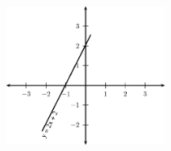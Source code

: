 {\begin{mdframed}[linewidth=4, leftmargin=40, rightmargin=40]
\begin{exercise}
\begin{enumerate}[noitemsep, label=\textbf{Step} \textbf{\arabic*}. ]
\setcounter{subfigure}{0}
\begin{figure}[H] %
\begin{center}
\label{m39338*id239959!!!underscore!!!media}\label{m39338*id239959!!!underscore!!!printimage}\includegraphics[width=200px]{col11306.imgs/m39338_MG10C11_011.png} %
\vspace{2pt}
\vspace{.1in}
\end{center}
\end{figure}       
\par 
\end{enumerate}
\end{exercise}
\end{mdframed}
}
\noindent

